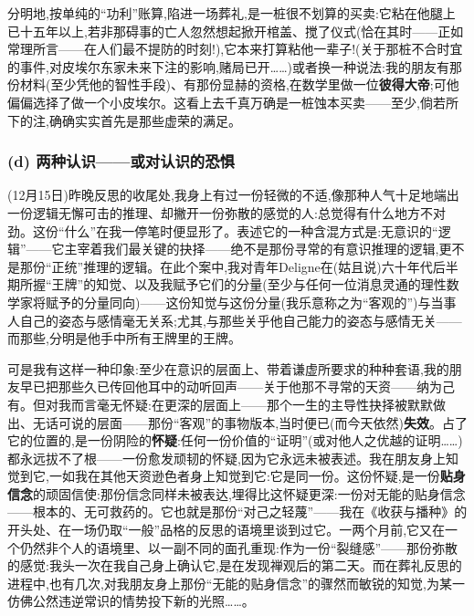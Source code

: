 分明地,按单纯的“功利”账算,陷进一场葬礼,是一桩很不划算的买卖:它粘在他腿上已十五年以上,若非那碍事的亡人忽然想起掀开棺盖、搅了仪式(恰在其时——正如常理所言——在人们最不提防的时刻!),它本来打算粘他一辈子!(关于那桩不合时宜的事件,对皮埃尔东家未来下注的影响,赌局已开……)或者换一种说法:我的朋友有那份材料(至少凭他的智性手段)、有那份显赫的资格,在数学里做一位\textbf{彼得大帝};可他偏偏选择了做一个小皮埃尔。这看上去千真万确是一桩蚀本买卖——至少,倘若所下的注,确确实实首先是那些虚荣的满足。

\subsubsection*{(d) 两种认识——或对认识的恐惧}
\label{ch18:local:h57}

\label{ch18:local:n52}

(12月15日)昨晚反思的收尾处,我身上有过一份轻微的不适,像那种人气十足地端出一份逻辑无懈可击的推理、却撇开一份弥散的感觉的人:总觉得有什么地方不对劲。这份“什么”在我一停笔时便显形了。表述它的一种含混方式是:无意识的“逻辑”——它主宰着我们最关键的抉择——绝不是那份寻常\dmark{}的有意识推理的逻辑,更不是那份“正统”推理的逻辑。在此个案中,我对青年Deligne在(姑且说)六十年代后半期所握“王牌”的知觉、以及我赋予它们的分量(至少与任何一位消息灵通的理性数学家将赋予的分量同向)——这份知觉与这份分量(我乐意称之为“客观的”)与当事人自己的姿态与感情毫无关系;尤其,与那些关乎他自己能力的姿态与感情无关——而那些,分明是他手中所有王牌里的王牌。

可是我有这样一种印象:至少在意识的层面上、带着谦虚所要求的种种套语,我的朋友早已把那些久已传回他耳中的动听回声——关于他那不寻常的天资——纳为己有。但对我而言毫无怀疑:在更深的层面上——那个一生的主导性抉择被默默做出、无话可说的层面——那份“客观”的事物版本,当时便已(而今天依然)\textbf{失效}。占了它的位置的,是一份阴险的\textbf{怀疑}:任何一份价值的“证明”(或对他人之优越的证明……)都永远拔不了根——一份愈发顽韧的怀疑,因为它永远未被表述。我在朋友身上知觉到它,一如我在其他天资逊色者身上知觉到它:它是同一份。这份怀疑,是一份\textbf{贴身信念}的顽固信使:那份信念同样未被表达,埋得比这怀疑更深:一份对无能的贴身信念——根本的、无可救药的。它也就是那份“对己之轻蔑”——我在《收获与播种》的开头处、在一场仍取“一般”品格的反思的语境里谈到过它。一两个月前,它又在一个仍然非个人的语境里、以一副不同的面孔重现:作为一份“裂缝感”——那份弥散的感觉:我头一次在我自己身上确认它,是在发现禅观后的第二天。而在葬礼反思的进程中,也有几次,对我朋友身上那份“无能的贴身信念”的骤然而敏锐的知觉,为某一仿佛公然违逆常识的情势投下新的光照……。

